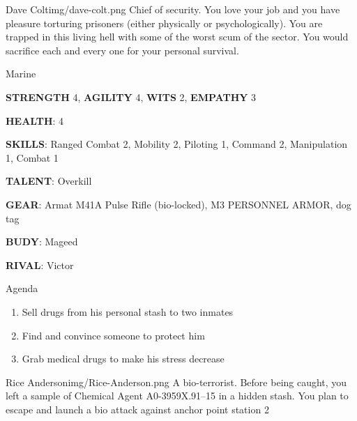 \clearpage

\begin{rpg-pcbox}{Dave Colt}{img/dave-colt.png}
    Chief of security. You love your job and you have pleasure torturing prisoners (either physically or psychologically). You are trapped in this living hell with some of the worst scum of the sector. You would sacrifice each and every one for your personal survival.
\end{rpg-pcbox}

\begin{rpg-commentbox}{}
    Marine

    \textbf{STRENGTH} 4, \textbf{AGILITY} 4, \textbf{WITS} 2, \textbf{EMPATHY} 3

    \textbf{HEALTH}: 4

    \textbf{SKILLS}: Ranged Combat 2, Mobility 2, Piloting 1, Command 2, Manipulation 1, Combat 1
    
    \textbf{TALENT}: Overkill
    
    \textbf{GEAR}: Armat M41A Pulse Rifle (bio-locked), M3 PERSONNEL ARMOR, dog tag

    \textbf{BUDY}: Mageed
    
    \textbf{RIVAL}: Victor
\end{rpg-commentbox}


\begin{rpg-commentbox}{Agenda}
    \begin{enumerate}[label=\textbf{Act \arabic*}, leftmargin=1cm]
        \item Sell drugs from his personal stash to two inmates
        \item Find and convince someone to protect him
        \item Grab medical drugs to make his stress decrease
    \end{enumerate}
\end{rpg-commentbox}

\newsect

\medskip \medskip \medskip \medskip \medskip \medskip \medskip \medskip \medskip \medskip \medskip \medskip 
\medskip \medskip \medskip \medskip \medskip \medskip \medskip \medskip \medskip \medskip \medskip \medskip 
\medskip \medskip \medskip \medskip \medskip \medskip \medskip \medskip \medskip \medskip \medskip \medskip 
\medskip \medskip \medskip \medskip \medskip \medskip \medskip \medskip \medskip \medskip \medskip \medskip 


\begin{rpg-pcbox}{Rice Anderson}{img/Rice-Anderson.png}
    A bio-terrorist. Before being caught, you left a sample of Chemical Agent A0-3959X.91–15 in a hidden stash. You plan to escape and launch a bio attack against anchor point station 2
\end{rpg-pcbox}

